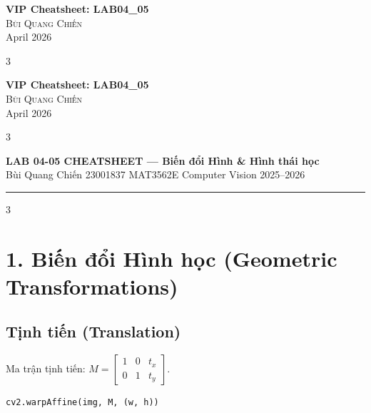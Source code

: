 \documentclass[9pt,landscape,a4paper]{extarticle}
\begin{document}
\begin{center}
    {\Large \bfseries VIP Cheatsheet: LAB04_05} \\
    \vspace{0.3cm}
    {\large \textsc{Bùi Quang Chiến}} \\
    \vspace{0.2cm}
    {\small April 2026}
\end{center}
\vspace{0.3cm}

\begin{multicols*}{3}

\begin{center}
    {\Large \bfseries VIP Cheatsheet: LAB04_05} \\
    \vspace{0.3cm}
    {\large \textsc{Bùi Quang Chiến}} \\
    \vspace{0.2cm}
    {\small April 2026}
\end{center}
\vspace{0.3cm}

\begin{multicols*}{3}

\begin{center}
  {\large\bfseries\color{hdr} LAB 04-05 CHEATSHEET --- Biến đổi Hình \& Hình thái học} \\[1pt]
  {\small Bùi Quang Chiến \textbullet{} 23001837 \textbullet{} MAT3562E Computer Vision 2025--2026}
\end{center}
\hrule\vspace{2pt}

\begin{multicols}{3}

\section{1. Biến đổi Hình học (Geometric Transformations)}

\subsection*{Tịnh tiến (Translation)}
Ma trận tịnh tiến: $M = \begin{bmatrix} 1 & 0 & t_x \\ 0 & 1 & t_y \end{bmatrix}$.\\
\begin{lstlisting}[language=Python]
cv2.warpAffine(img, M, (w, h))
\end{lstlisting}


\end{multicols}
\end{multicols*}
\end{multicols*}
\end{document}
